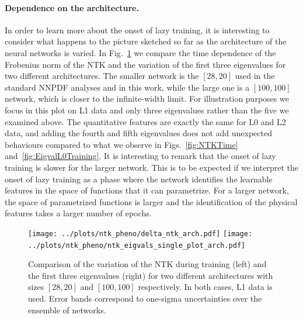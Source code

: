 \FloatBarrier

\paragraph{Dependence on the architecture.}
In order to learn more about the onset of lazy training, it is interesting to consider what happens to 
the picture sketched so far as the architecture of the neural networks is varied. In Fig.~\ref{fig:NTKTimeDiffArch}
we compare the time dependence of the Frobenius norm of the NTK and the variation of the first three eigenvalues
for two different architectures. The smaller network is the $[28,20]$ used in the standard NNPDF
analyses and in this work, while the large one is a $[100,100]$ network, which is closer to the infinite-width
limit. For illustration purposes we focus in this plot on L1 data and only three eigenvalues rather than the five
we examined above. The quantitative features are exactly the same for L0 and L2 data, and adding the fourth 
and fifth eigenvalues does not add unexpected behaviours compared to what we observe in Figs.~\ref{fig:NTKTime} 
and~\ref{fig:EigvalL0Training}. It is interesting to remark that the onset of lazy training is slower 
for the larger network. This is to be expected if we interpret the onset of lazy training as a phase where 
the network identifies the learnable features in the space of functions that it can parametrize. For a 
larger network, the space of parametrized functions is larger and the identification of the physical 
features takes a larger number of epochs. 
\begin{figure}[ht!]
  \centering
  \texttt{[image: ../plots/ntk\_pheno/delta\_ntk\_arch.pdf]}
  \texttt{[image: ../plots/ntk\_pheno/ntk\_eigvals\_single\_plot\_arch.pdf]}
  \caption{Comparison of the variation of the NTK during training (left) and the
  first three eigenvalues (right) for two different architectures with sizes
  $[28,20]$ and $[100,100]$ respectively. In both cases, L1 data is used. Error
  bands correspond to one-sigma uncertainties over the ensemble of networks.}
  \label{fig:NTKTimeDiffArch}
\end{figure}

\FloatBarrier

